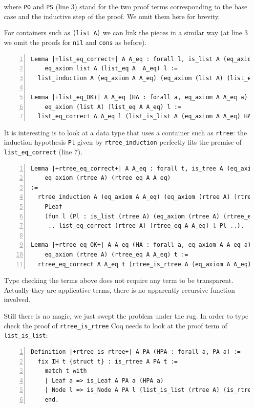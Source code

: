 \documentclass[a4paper,UKenglish,cleveref, autoref]{lipics-v2019}
\begin{document}
\noindent
where \lstinline+PO+ and \lstinline+PS+ (line 3) stand for
the two proof terms corresponding to the base case and the inductive
step of the proof. We omit them here for brevity.

For containers such as \lstinline+(list A)+ we can link the pieces in a
similar way (at line 3 we omit the proofs for
\lstinline+nil+ and \lstinline+cons+ as before).

\begin{lstlisting}[numbers=left]
Lemma |+list_eq_correct+| A A_eq : forall l, is_list A (eq_axiom A  A_eq) l ->
    eq_axiom list A (list_eq A  A_eq) l :=
  list_induction A (eq_axiom A A_eq) (eq_axiom (list A) (list_eq A A_eq)) Pnil Pcons.

Lemma |+list_eq_OK+| A A_eq (HA : forall a, eq_axiom A A_eq a) l :
    eq_axiom (list A) (list_eq A A_eq) l :=
  list_eq_correct A A_eq l (list_is_list A (eq_axiom A A_eq) HA l).
\end{lstlisting}

\noindent
It is interesting is to look at a data type that uses a container such as
\lstinline+rtree+: the induction hypothesis
\lstinline+Pl+
given by \lstinline+rtree_induction+ perfectly fits
the premise of \lstinline+list_eq_correct+ (line 7).

\begin{lstlisting}[numbers=left]
Lemma |+rtree_eq_correct+| A A_eq : forall t, is_tree A (eq_axiom A A_eq) t ->
    eq_axiom (rtree A) (rtree_eq A A_eq)
:=
  rtree_induction A (eq_axiom A A_eq) (eq_axiom (rtree A) (rtree_eq Afa))
    PLeaf
    (fun l (Pl : is_list (rtree A) (eq_axiom (rtree A) (rtree_eq A A_eq)) l) =>
     .. list_eq_correct (rtree A) (rtree_eq A A_eq) l Pl ..).

Lemma |+rtree_eq_OK+| A A_eq (HA : forall a, eq_axiom A A_eq a) t :
    eq_axiom (rtree A) (rtree_eq A A_eq) t :=
  rtree_eq_correct A A_eq t (rtree_is_rtree A (eq_axiom A A_eq) HA t).
\end{lstlisting}

Type checking the terms above does not require any term to be
transparent. Actually they are applicative terms, there is no
apparently recursive function involved.

Still there is no magic, we just swept the problem under the rug.
In order to type check the proof
of \lstinline+rtree_is_rtree+ Coq needs to look at the
proof term of \lstinline+list_is_list+:

\begin{lstlisting}[numbers=left]
Definition |+rtree_is_rtree+| A PA (HPA : forall a, PA a) :=
  fix IH t {struct t} : is_rtree A PA t :=
    match t with
    | Leaf a => is_Leaf A PA a (HPA a)
    | Node l => is_Node A PA l (list_is_list (rtree A) (is_rtree A) IH l)
    end.
\end{lstlisting}
\end{document}
